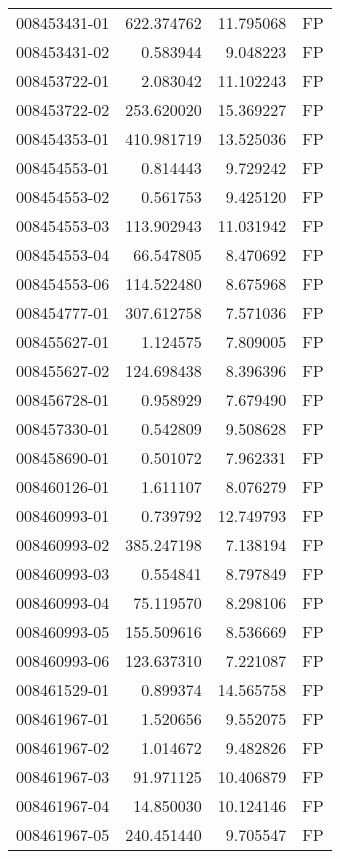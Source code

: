 \begin{tabular}{lrrl}
008453431-01 &  622.374762 &    11.795068 &   FP \\
008453431-02 &    0.583944 &     9.048223 &   FP \\
008453722-01 &    2.083042 &    11.102243 &   FP \\
008453722-02 &  253.620020 &    15.369227 &   FP \\
008454353-01 &  410.981719 &    13.525036 &   FP \\
008454553-01 &    0.814443 &     9.729242 &   FP \\
008454553-02 &    0.561753 &     9.425120 &   FP \\
008454553-03 &  113.902943 &    11.031942 &   FP \\
008454553-04 &   66.547805 &     8.470692 &   FP \\
008454553-06 &  114.522480 &     8.675968 &   FP \\
008454777-01 &  307.612758 &     7.571036 &   FP \\
008455627-01 &    1.124575 &     7.809005 &   FP \\
008455627-02 &  124.698438 &     8.396396 &   FP \\
008456728-01 &    0.958929 &     7.679490 &   FP \\
008457330-01 &    0.542809 &     9.508628 &   FP \\
008458690-01 &    0.501072 &     7.962331 &   FP \\
008460126-01 &    1.611107 &     8.076279 &   FP \\
008460993-01 &    0.739792 &    12.749793 &   FP \\
008460993-02 &  385.247198 &     7.138194 &   FP \\
008460993-03 &    0.554841 &     8.797849 &   FP \\
008460993-04 &   75.119570 &     8.298106 &   FP \\
008460993-05 &  155.509616 &     8.536669 &   FP \\
008460993-06 &  123.637310 &     7.221087 &   FP \\
008461529-01 &    0.899374 &    14.565758 &   FP \\
008461967-01 &    1.520656 &     9.552075 &   FP \\
008461967-02 &    1.014672 &     9.482826 &   FP \\
008461967-03 &   91.971125 &    10.406879 &   FP \\
008461967-04 &   14.850030 &    10.124146 &   FP \\
008461967-05 &  240.451440 &     9.705547 &   FP \\

\end{tabular}
